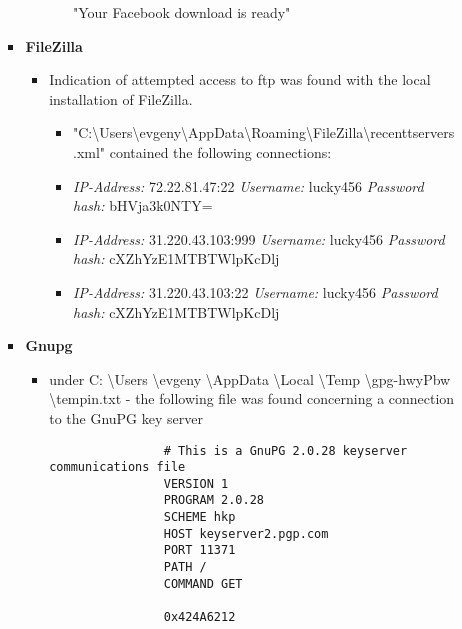 \begin{enumerate}
\begin{itemize}
\begin{itemize}
\begin{itemize}
\begin{itemize}
				"Your Facebook download is ready"
				
			\end{itemize}
		\end{itemize}
	
	\item \textbf{FileZilla}
	\begin{itemize}
		
	\item Indication of attempted access to ftp was found with the local installation of FileZilla.
	
	\begin{itemize}
		\item "C:\textbackslash Users\textbackslash evgeny\textbackslash AppData\textbackslash Roaming\textbackslash FileZilla\textbackslash recenttservers.xml" contained the following connections:
		\item \textit{IP-Address:} 72.22.81.47:22 \textit{Username:} lucky456 \textit{Password hash:} bHVja3k0NTY=
		\item \textit{IP-Address:} 31.220.43.103:999 \textit{Username:} lucky456 \textit{Password hash:} cXZhYzE1MTBTWlpKcDlj
		\item \textit{IP-Address:} 31.220.43.103:22 \textit{Username:} lucky456 \textit{Password hash:} cXZhYzE1MTBTWlpKcDlj\\
		
	\end{itemize}
	\end{itemize}
	\item \textbf{Gnupg}
		\begin{itemize}
			\item under C: \textbackslash Users \textbackslash evgeny \textbackslash AppData \textbackslash Local \textbackslash Temp \textbackslash gpg-hwyPbw \textbackslash tempin.txt - the following file was found concerning a connection to the GnuPG key server
			\begin{lstlisting}
				# This is a GnuPG 2.0.28 keyserver communications file
				VERSION 1
				PROGRAM 2.0.28
				SCHEME hkp
				HOST keyserver2.pgp.com
				PORT 11371
				PATH /
				COMMAND GET
				
				0x424A6212

			\end{lstlisting}
		\end{itemize}
		

\end{itemize}
\end{itemize}
\end{enumerate}
